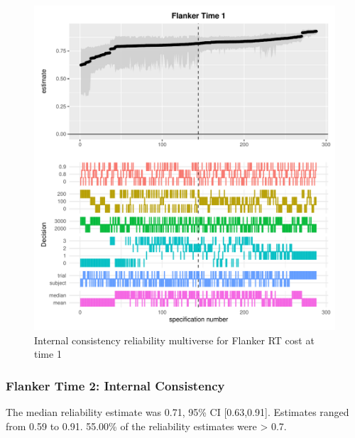 \documentclass[
  english,
  man,floatsintext]{apa6}
\begin{document}
\begin{figure}
\centering
\includegraphics{Reliability_Multiverse_files/figure-latex/unnamed-chunk-8-1.pdf}
\caption{\label{fig:unnamed-chunk-8}Internal consistency reliability multiverse for Flanker RT cost at time 1}
\end{figure}

\newpage

\hypertarget{flanker-time-2-internal-consistency}{%
\subsubsection{Flanker Time 2: Internal Consistency}\label{flanker-time-2-internal-consistency}}

The median reliability estimate was 0.71, 95\% CI {[}0.63,0.91{]}. Estimates ranged from 0.59 to 0.91. 55.00\% of the reliability estimates were \textgreater{} 0.7.
\end{document}
